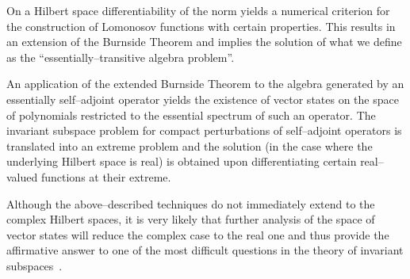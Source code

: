On a Hilbert space differentiability of the norm yields a numerical criterion
for the construction of Lomonosov functions with certain properties. This
results in an extension of the Burnside Theorem and implies the solution of
what we define as the ``essentially--transitive algebra problem''.

An application of the extended Burnside Theorem to the algebra generated by
an essentially self--adjoint operator yields the existence of vector states
on the space of polynomials restricted to the essential spectrum of such an
operator. The invariant subspace problem for compact perturbations of
self--adjoint operators is translated into an extreme problem and the
solution (in the case where the underlying Hilbert space is real) is obtained
upon differentiating certain real--valued functions at their extreme.

Although the above--described techniques do not immediately extend to the
complex Hilbert spaces, it is very likely that further analysis of the space
of vector states will reduce the complex case to the real one and thus
provide the affirmative answer to one of the most difficult questions in the
theory of invariant subspaces~\cite{Lom92}.

